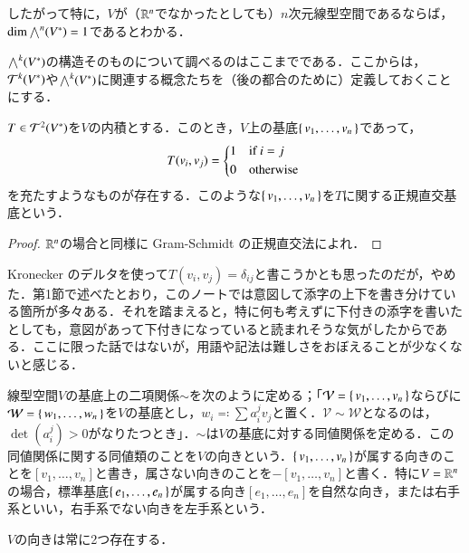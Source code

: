 したがって特に，$V$が（$\mathbb{R}^n$でなかったとしても）$n$次元線型空間であるならば，$\dim \bigwedge^n(V^*)=1$であるとわかる．

$\bigwedge^k(V^*)$の構造そのものについて調べるのはここまでである．ここからは，$\mathcal{T}^k(V^*)$や$\bigwedge^k(V^*)$に関連する概念たちを（後の都合のために）定義しておくことにする．

\begin{lem}
$T \in \mathcal{T}^2(V^*)$を$V$の内積とする．このとき，$V$上の基底$\set{v_1, \dots, v_n}$であって，
\begin{equation}
T(v_i, v_j) = \begin{dcases*}
    1 & if $i=j$ \\
    0 & otherwise
  \end{dcases*}
\end{equation}
を充たすようなものが存在する．このような$\set{v_1, \dots, v_n}$を$T$に関する正規直交基底という．
\end{lem}

\begin{proof}
$\mathbb{R}^n$の場合と同様に Gram-Schmidt の正規直交法によれ．
\end{proof}

\begin{dig}
Kronecker のデルタを使って$T(v_i, v_j) = \delta_{ij}$と書こうかとも思ったのだが，やめた．第1節で述べたとおり，このノートでは意図して添字の上下を書き分けている箇所が多々ある．それを踏まえると，特に何も考えずに下付きの添字を書いたとしても，意図があって下付きになっていると読まれそうな気がしたからである．ここに限った話ではないが，用語や記法は難しさをおぼえることが少なくないと感じる．
\end{dig}

\begin{defi}
線型空間$V$の基底上の二項関係$\sim$を次のように定める；「$\mathcal{V} = \set{v_1, \dots, v_n}$ならびに$\mathcal{W} = \set{w_1, \dots, w_n}$を$V$の基底とし，$w_i \eqqcolon \sum a_i^j v_j$と置く．$\mathcal{V} \sim \mathcal{W}$となるのは，$\det \left(a_i^j\right) > 0$がなりたつとき」．$\sim$は$V$の基底に対する同値関係を定める．この同値関係に関する同値類のことを$V$の向きという．$\set{v_1, \dots, v_n}$が属する向きのことを$[ v_1, \dots, v_n ]$と書き，属さない向きのことを$- [ v_1, \dots, v_n ]$と書く．特に$V=\mathbb{R}^n$の場合，標準基底$\set{e_1, \dots, e_n}$が属する向き$[e_1, \dots, e_n]$を自然な向き，または右手系といい，右手系でない向きを左手系という．
\end{defi}

\begin{que}
$V$の向きは常に2つ存在する．
\end{que}

